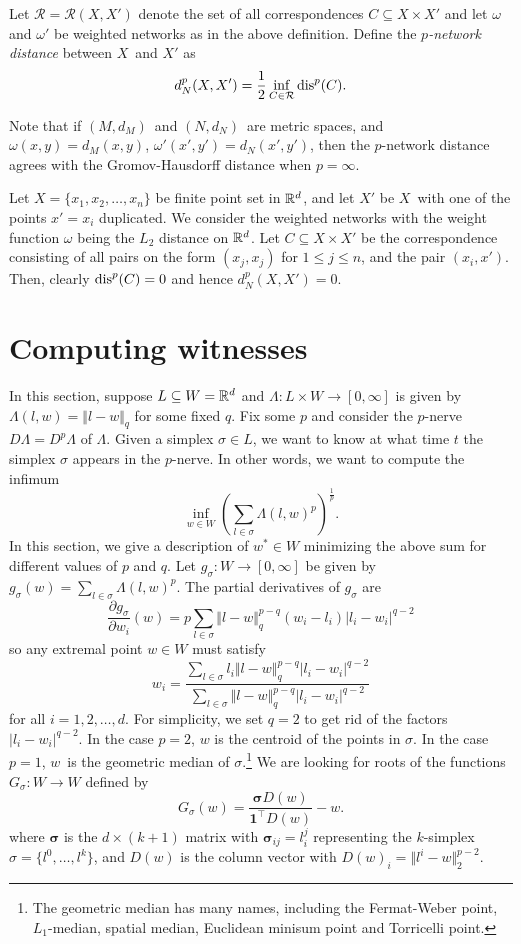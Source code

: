 	\begin{defn}
		Let $\mathcal{R}=\mathcal{R}(X,X')$ denote the set of all correspondences $C\subseteq X\times X'$ and let $\omega$ and $\omega'$ be weighted networks as in the above definition. Define the \textit{$p$-network distance} between $X$ and $X'$ as
		$$
		d_N^p(X,X')=\frac{1}{2}\inf_{C\in\mathcal{R}}\operatorname{dis}^p(C).
		$$
	\end{defn}
	Note that if $(M,d_M)$ and $(N,d_N)$ are metric spaces, and $\omega(x,y)=d_M(x,y)$, $\omega'(x',y')=d_N(x',y')$, then the $p$-network distance agrees with the Gromov-Hausdorff distance when $p=\infty$.
	
	\begin{ex}
		Let $X=\{x_1,x_2,\ldots, x_n\}$ be finite point set in $\mathbb{R}^d$, and let $X'$ be $X$ with one of the points $x'=x_i$ duplicated. We consider the weighted networks with the weight function $\omega$ being the $L_2$ distance on $\mathbb{R}^d$. Let $C\subseteq X\times X'$ be the correspondence consisting of all pairs on the form $(x_j, x_j)$ for $1\leq j\leq n$, and the pair $(x_i, x')$. Then, clearly $\operatorname{dis}^p(C)=0$ and hence $d_N^p(X,X')=0$.
	\end{ex}
	
	\section{Computing witnesses}
	In this section, suppose $L\subseteq W=\mathbb{R}^d$ and $\Lambda\colon L\times W\to [0,\infty]$ is given by $\Lambda(l,w)=\Vert l-w\Vert_q$ for some fixed $q$. Fix some $p$ and consider the $p$-nerve $D\Lambda=D^p\Lambda$ of $\Lambda$. Given a simplex $\sigma\in L$, we want to know at what time $t$ the simplex $\sigma$ appears in the $p$-nerve. In other words, we want to compute the infimum
	$$
	\inf_{w\in W}\left(\sum_{l\in\sigma}\Lambda(l,w)^p\right)^{\frac{1}{p}}.
	$$
	In this section, we give a description of $w^*\in W$ minimizing the above sum for different values of $p$ and $q$. Let $g_\sigma\colon W\to[0,\infty]$ be given by $g_\sigma(w)=\sum_{l\in\sigma}\Lambda(l,w)^p$. The partial derivatives of $g_\sigma$ are 
	$$
	\frac{\partial g_\sigma}{\partial w_i}(w)=p\sum_{l\in\sigma}\Vert l-w\Vert_q^{p-q}(w_i-l_i)|l_i-w_i|^{q-2}
	$$
	so any extremal point $w\in W$ must satisfy
	$$
	w_i = \frac{\sum_{l\in\sigma}l_i\Vert l-w\Vert_q^{p-q}|l_i-w_i|^{q-2}}{\sum_{l\in\sigma}\Vert l-w\Vert_q^{p-q}|l_i-w_i|^{q-2}}
	$$
	for all $i=1,2,\ldots, d$. For simplicity, we set $q=2$ to get rid of the factors $|l_i-w_i|^{q-2}$. In the case $p=2$, $w$ is the centroid of the points in $\sigma$. In the case $p=1$, $w$ is the geometric median of $\sigma$.\footnote{The geometric median has many names, including the Fermat-Weber point, $L_1$-median, spatial median, Euclidean minisum point and Torricelli point.} We are looking for roots of the functions $G_\sigma\colon W\to W$ defined by
	$$
	G_\sigma(w)=\frac{\boldsymbol{\sigma}D(w)}{\mathbf{1}^\top D(w)}-w.
	$$
	where $\boldsymbol{\sigma}$ is the $d\times(k+1)$ matrix with $\boldsymbol{\sigma}_{ij}=l^j_i$ representing the $k$-simplex $\sigma=\{l^0,\ldots,l^k\}$, and $D(w)$ is the column vector with $D(w)_i=\Vert l^i - w\Vert^{p-2}_2$.
	
